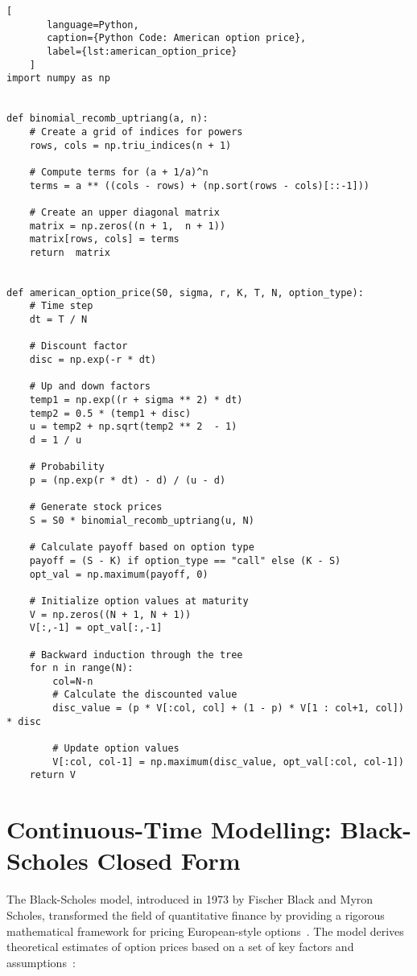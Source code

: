     \begin{lstlisting}[
       language=Python,
       caption={Python Code: American option price},
       label={lst:american_option_price}
    ]
import numpy as np


def binomial_recomb_uptriang(a, n):
    # Create a grid of indices for powers
    rows, cols = np.triu_indices(n + 1)

    # Compute terms for (a + 1/a)^n
    terms = a ** ((cols - rows) + (np.sort(rows - cols)[::-1]))

    # Create an upper diagonal matrix
    matrix = np.zeros((n + 1,  n + 1))
    matrix[rows, cols] = terms
    return  matrix


def american_option_price(S0, sigma, r, K, T, N, option_type):
    # Time step
    dt = T / N

    # Discount factor
    disc = np.exp(-r * dt)

    # Up and down factors
    temp1 = np.exp((r + sigma ** 2) * dt)
    temp2 = 0.5 * (temp1 + disc)
    u = temp2 + np.sqrt(temp2 ** 2  - 1)
    d = 1 / u

    # Probability
    p = (np.exp(r * dt) - d) / (u - d)

    # Generate stock prices
    S = S0 * binomial_recomb_uptriang(u, N)

    # Calculate payoff based on option type
    payoff = (S - K) if option_type == "call" else (K - S)
    opt_val = np.maximum(payoff, 0)

    # Initialize option values at maturity
    V = np.zeros((N + 1, N + 1))
    V[:,-1] = opt_val[:,-1]

    # Backward induction through the tree
    for n in range(N):
        col=N-n
        # Calculate the discounted value
        disc_value = (p * V[:col, col] + (1 - p) * V[1 : col+1, col]) * disc

        # Update option values
        V[:col, col-1] = np.maximum(disc_value, opt_val[:col, col-1])
    return V
   \end{lstlisting}

\section{Continuous-Time Modelling: Black-Scholes Closed Form}
    \label{sec:cont_time}

    The Black-Scholes model, introduced in 1973 by Fischer Black and Myron Scholes,
    transformed the field of quantitative finance by providing a rigorous mathematical framework for
    pricing European-style options~\cite{black_pricing_1973}.
    The model derives theoretical estimates of option prices based on a set of key factors and
    assumptions~\cite{wilmott_paul_2007}:

